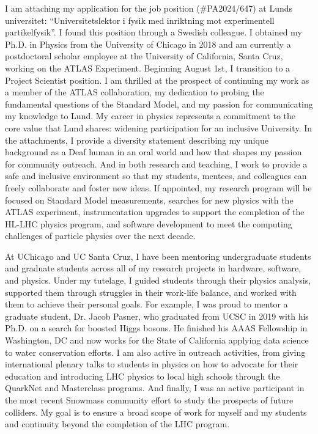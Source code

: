 
I am attaching my application for the job position (\#PA2024/647) at Lunds universitet: \enquote{Universitetslektor i fysik med inriktning mot experimentell partikelfysik}. I found this position through a Swedish colleague. I obtained my Ph.D. in Physics from the University of Chicago in 2018 and am currently a postdoctoral scholar employee at the University of California, Santa Cruz, working on the ATLAS Experiment. Beginning August 1st, I transition to a Project Scientist position. I am thrilled at the prospect of continuing my work as a member of the ATLAS collaboration, my dedication to probing the fundamental questions of the Standard Model, and my passion for communicating my knowledge to Lund. My career in physics represents a commitment to the core value that Lund shares: widening participation for an inclusive University. In the attachments, I provide a diversity statement describing my unique background as a Deaf human in an oral world and how that shapes my passion for community outreach. And in both research and teaching, I work to provide a safe and inclusive environment so that my students, mentees, and colleagues can freely collaborate and foster new ideas. If appointed, my research program will be focused on Standard Model measurements, searches for new physics with the ATLAS experiment, instrumentation upgrades to support the completion of the HL-LHC physics program, and software development to meet the computing challenges of particle physics over the next decade.

At UChicago and UC Santa Cruz, I have been mentoring undergraduate students and graduate students across all of my research projects in hardware, software, and physics. Under my tutelage, I guided students through their physics analysis, supported them through struggles in their work-life balance, and worked with them to achieve their personal goals. For example, I was proud to mentor a graduate student, Dr. Jacob Pasner, who graduated from UCSC in 2019 with his Ph.D. on a search for boosted Higgs bosons. He finished his AAAS Fellowship in Washington, DC and now works for the State of California applying data science to water conservation efforts. I am also active in outreach activities, from giving international plenary talks to students in physics on how to advocate for their education and introducing LHC physics to local high schools through the QuarkNet and Masterclass programs. And finally, I was an active participant in the most recent Snowmass community effort to study the prospects of future colliders. My goal is to ensure a broad scope of work for myself and my students and continuity beyond the completion of the LHC program.

